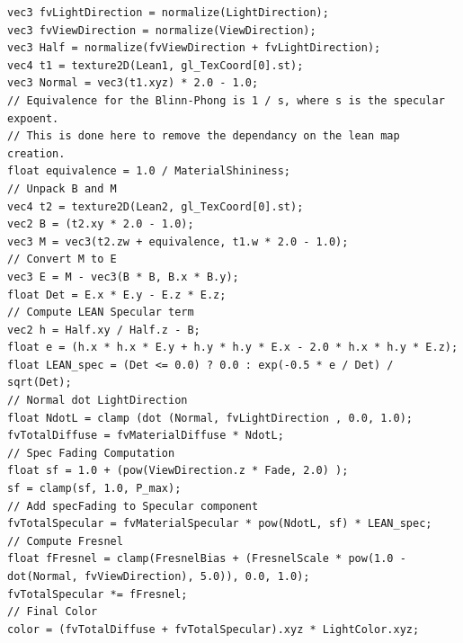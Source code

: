 \documentclass[10pt, conference]{IEEEtran}
\begin{document}
\lstset{basicstyle=\footnotesize,xleftmargin=20pt,numbers=left, breaklines=true, language=C, caption=GLSL pseudo code for specular fading applied in LEAN shader in tangent space., label=GLSLCode}
\begin{lstlisting}
vec3 fvLightDirection = normalize(LightDirection);
vec3 fvViewDirection = normalize(ViewDirection);
vec3 Half = normalize(fvViewDirection + fvLightDirection);
vec4 t1 = texture2D(Lean1, gl_TexCoord[0].st);
vec3 Normal = vec3(t1.xyz) * 2.0 - 1.0;
// Equivalence for the Blinn-Phong is 1 / s, where s is the specular expoent.
// This is done here to remove the dependancy on the lean map creation.
float equivalence = 1.0 / MaterialShininess;
// Unpack B and M
vec4 t2 = texture2D(Lean2, gl_TexCoord[0].st);
vec2 B = (t2.xy * 2.0 - 1.0);
vec3 M = vec3(t2.zw + equivalence, t1.w * 2.0 - 1.0);
// Convert M to E
vec3 E = M - vec3(B * B, B.x * B.y);
float Det = E.x * E.y - E.z * E.z;
// Compute LEAN Specular term
vec2 h = Half.xy / Half.z - B;
float e = (h.x * h.x * E.y + h.y * h.y * E.x - 2.0 * h.x * h.y * E.z);
float LEAN_spec = (Det <= 0.0) ? 0.0 : exp(-0.5 * e / Det) / sqrt(Det);
// Normal dot LightDirection
float NdotL = clamp (dot (Normal, fvLightDirection , 0.0, 1.0);
fvTotalDiffuse = fvMaterialDiffuse * NdotL;
// Spec Fading Computation
float sf = 1.0 + (pow(ViewDirection.z * Fade, 2.0) );
sf = clamp(sf, 1.0, P_max);
// Add specFading to Specular component
fvTotalSpecular = fvMaterialSpecular * pow(NdotL, sf) * LEAN_spec;
// Compute Fresnel
float fFresnel = clamp(FresnelBias + (FresnelScale * pow(1.0 - dot(Normal, fvViewDirection), 5.0)), 0.0, 1.0);
fvTotalSpecular *= fFresnel;
// Final Color
color = (fvTotalDiffuse + fvTotalSpecular).xyz * LightColor.xyz;
\end{lstlisting}
\end{document}
